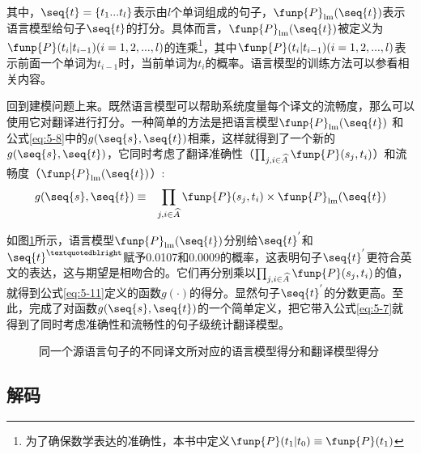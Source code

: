 \noindent  其中，$\seq{t}=\{ t_1...t_l \}$表示由$l$个单词组成的句子，$\funp{P}_{\textrm{lm}}(\seq{t})$表示语言模型给句子$\seq{t}$的打分。具体而言，$\funp{P}_{\textrm{lm}}(\seq{t})$被定义为$\funp{P}(t_i|t_{i-1})(i=1,2,...,l)$的连乘\footnote{为了确保数学表达的准确性，本书中定义$\funp{P}(t_1|t_0) \equiv \funp{P}(t_1)$}，其中$\funp{P}(t_i|t_{i-1})(i=1,2,...,l)$表示前面一个单词为$t_{i-1}$时，当前单词为$t_i$的概率。语言模型的训练方法可以参看{\chaptertwo}相关内容。

\parinterval 回到建模问题上来。既然语言模型可以帮助系统度量每个译文的流畅度，那么可以使用它对翻译进行打分。一种简单的方法是把语言模型$\funp{P}_{\textrm{lm}}{(\seq{t})}$ 和公式\eqref{eq:5-8}中的$g(\seq{s},\seq{t})$相乘，这样就得到了一个新的$g(\seq{s},\seq{t})$，它同时考虑了翻译准确性（$\prod_{j,i \in \widehat{A}}{\funp{P}(s_j,t_i)}$）和流畅度（$\funp{P}_{\textrm{lm}}(\seq{t})$）:
\begin{eqnarray}
g(\seq{s},\seq{t}) & \equiv & \prod_{j,i \in \widehat{A}}{\funp{P}(s_j,t_i)} \times  \funp{P}_{\textrm{lm}}(\seq{t})
\label{eq:5-11}
\end{eqnarray}

\parinterval 如图\ref{fig:5-9}所示，语言模型$\funp{P}_{\textrm{lm}}(\seq{t})$分别给$\seq{t}^{'}$和$\seq{t}^{”}$赋予0.0107和0.0009的概率，这表明句子$\seq{t}^{'}$更符合英文的表达，这与期望是相吻合的。它们再分别乘以$\prod_{j,i \in \widehat{A}}{\funp{P}(s_j},t_i)$的值，就得到公式\eqref{eq:5-11}定义的函数$g(\cdot)$的得分。显然句子$\seq{t}^{'}$的分数更高。至此，完成了对函数$g(\seq{s},\seq{t})$的一个简单定义，把它带入公式\eqref{eq:5-7}就得到了同时考虑准确性和流畅性的句子级统计翻译模型。

\begin{figure}[htp]
    \centering

    \caption{同一个源语言句子的不同译文所对应的语言模型得分和翻译模型得分}
    \label{fig:5-9}
\end{figure}



\subsection{解码}
\label{sec:simple-decoding}

